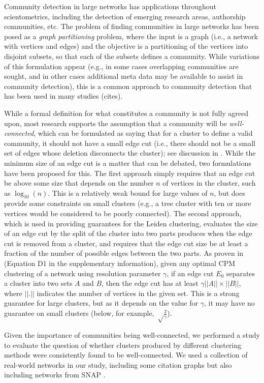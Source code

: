 \documentclass[12pt, oneside]{article}   	%
\begin{document}
Community detection in large networks has applications throughout scientometrics, including the detection of emerging research areas, authorship communities, etc.
The problem of finding communities in large networks has been posed as a {\em graph partitioning} problem, where the input is a graph (i.e., a network with vertices and edges) and the
objective is a partitioning of the vertices into disjoint subsets, so that each of the subsets defines a community.
While variations of this formulation appear (e.g., in some cases overlapping communities are sought, and in other cases additional meta data may be available to assist in community
detection), this is a common approach to community detection that has been used in many studies (cites).

While a formal definition for what constitutes a community is not fully agreed upon, most research supports the assumption that a community will be {\em well-connected}, which
can be formulated as saying that for a cluster to define a valid community, it  should not have a small edge cut (i.e., there should not be a small set of edges whose deletion disconnects
the cluster); see discussion in
\cite{Traag_2019}. 
While the minimum size of an edge cut is a matter that can be debated, two formulations have been proposed for this.
The first approach simply requires that an edge cut be above some size that depends on the number $n$ of vertices in the cluster, such as $\log_{10}(n)$. 
This is a relatively weak bound for large values of $n$, but does provide some constraints on small clusters (e.g., a tree cluster with ten or more vertices would be considered to be poorly connected).  
The second approach, which is used in providing guarantees for the Leiden clustering, evaluates the size of an edge cut by the split  of the cluster into two parts produces when the edge cut is removed from a cluster, and requires that the
edge cut size be at least a fraction of the number of possible edges between the two  parts.
As proven in \cite{Traag_2019} (Equation D1 in the supplementary information), 
given any optimal CPM clustering of a network using resolution parameter $\gamma$, if an edge cut $E_0$
separates a cluster into two sets $A$ and $B$, then the edge cut has at least $\gamma ||A|| \times ||B||$, where
$||.||$ indicates the number of vertices in the given set.
This is a strong guarantee for large clusters,  but as it depends on the value for $\gamma$, it may have no guarantee on small clusters (below, for example, 
$\sqrt \frac{2}{\gamma}$).

Given the importance of communities being well-connected, we performed a study to evaluate the question of whether clusters produced by different clustering methods
were consistently found to be well-connected.
We used a collection of real-world networks in our study, including some citation graphs but also including networks from SNAP \citep{leskovec2016snap}.
\end{document}
